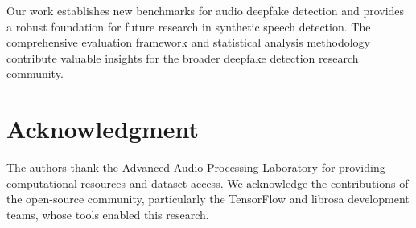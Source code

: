 \documentclass[conference]{IEEEtran}
\begin{document}
Our work establishes new benchmarks for audio deepfake detection and provides a robust foundation for future research in synthetic speech detection. The comprehensive evaluation framework and statistical analysis methodology contribute valuable insights for the broader deepfake detection research community.

\section*{Acknowledgment}

The authors thank the Advanced Audio Processing Laboratory for providing computational resources and dataset access. We acknowledge the contributions of the open-source community, particularly the TensorFlow and librosa development teams, whose tools enabled this research.
\end{document}
